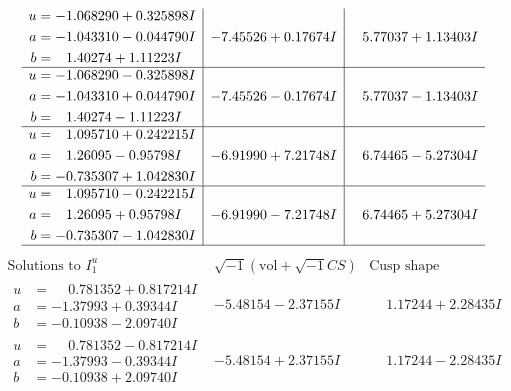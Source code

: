 \documentclass[1p]{elsarticle_modified}
\theoremstyle{definition}
\newcommand{\I}{\sqrt{-1}}
\begin{document}
$$\begin{array}{c|c|c}
\begin{aligned}
u &= -1.068290 + 0.325898 I \\
a &= -1.043310 - 0.044790 I \\
b &= \phantom{-}1.40274 + 1.11223 I\end{aligned}
 & -7.45526 + 0.17674 I & \phantom{-}5.77037 + 1.13403 I \\ \hline\begin{aligned}
u &= -1.068290 - 0.325898 I \\
a &= -1.043310 + 0.044790 I \\
b &= \phantom{-}1.40274 - 1.11223 I\end{aligned}
 & -7.45526 - 0.17674 I & \phantom{-}5.77037 - 1.13403 I \\ \hline\begin{aligned}
u &= \phantom{-}1.095710 + 0.242215 I \\
a &= \phantom{-}1.26095 - 0.95798 I \\
b &= -0.735307 + 1.042830 I\end{aligned}
 & -6.91990 + 7.21748 I & \phantom{-}6.74465 - 5.27304 I \\ \hline\begin{aligned}
u &= \phantom{-}1.095710 - 0.242215 I \\
a &= \phantom{-}1.26095 + 0.95798 I \\
b &= -0.735307 - 1.042830 I\end{aligned}
 & -6.91990 - 7.21748 I & \phantom{-}6.74465 + 5.27304 I\\
 \hline 
 \end{array}$$\newpage$$\begin{array}{c|c|c}  
\text{Solutions to }I^u_{1}& \I (\text{vol} + \sqrt{-1}CS) & \text{Cusp shape}\\
 \hline 
\begin{aligned}
u &= \phantom{-}0.781352 + 0.817214 I \\
a &= -1.37993 + 0.39344 I \\
b &= -0.10938 - 2.09740 I\end{aligned}
 & -5.48154 - 2.37155 I & \phantom{-}1.17244 + 2.28435 I \\ \hline\begin{aligned}
u &= \phantom{-}0.781352 - 0.817214 I \\
a &= -1.37993 - 0.39344 I \\
b &= -0.10938 + 2.09740 I\end{aligned}
 & -5.48154 + 2.37155 I & \phantom{-}1.17244 - 2.28435 I \\ \hline\begin{aligned}

\end{aligned}
\end{array}$$
\end{document}
